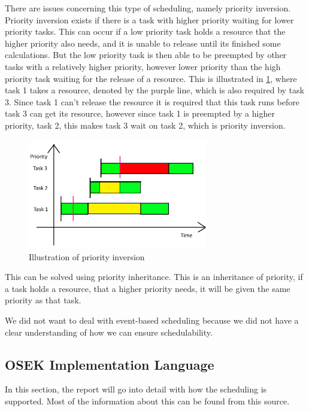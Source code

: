 There are issues concerning this type of scheduling, namely priority inversion. Priority inversion exists if there is a task with higher priority waiting for lower priority tasks. This can occur if a low priority task holds a resource that the higher priority also needs, and it is unable to release until its finished some calculations. But the low priority task is then able to be preempted by other tasks with a relatively higher priority, however lower priority than the high priority task waiting for the release of a resource. This is illustrated in \ref{priorityInvertion}, where task 1 takes a resource, denoted by the purple line, which is also required by task 3. Since task 1 can't release the resource it is required that this task runs before task 3 can get its resource, however since task 1 is preempted by a higher priority, task 2, this makes task 3 wait on task 2, which is priority inversion.
\begin{figure}[H]
    \centering
    \includegraphics[width=0.7\textwidth]{Images/Analysis/priorityInvertion.png}
    \caption{Illustration of priority inversion}
    \label{priorityInvertion}
\end{figure}

This can be solved using priority inheritance. This is an inheritance of priority, if a task holds a resource, that a higher priority needs, it will be given the same priority as that task. 

We did not want to deal with event-based scheduling because we did not have a clear understanding of how we can ensure schedulability.

\subsection{\textbf{OSEK Implementation Language}}\label{OILteo}
In this section, the report will go into detail with how the scheduling is supported. Most of the information about this can be found from this source\cite{OILManual}.

